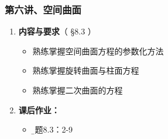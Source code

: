 
\begin{frame}
	\frametitle{第六讲、空间曲面}
	\linespread{1.5}
	\begin{enumerate}
	  \item {\bf 内容与要求}{\color{blue}（ \S8.3 ）}
	  \begin{itemize}
	    \item 熟练掌握空间曲面方程的参数化方法
	    \item 熟练掌握旋转曲面与柱面方程
	    \item 熟练掌握二次曲面的方程
	  \vspace{1em}
	  \end{itemize}
	  \item {\bf  课后作业：}
	  \begin{itemize}
	    \item {\b 习题8.3：2-9}
	  \end{itemize}
	\end{enumerate}
\end{frame}

